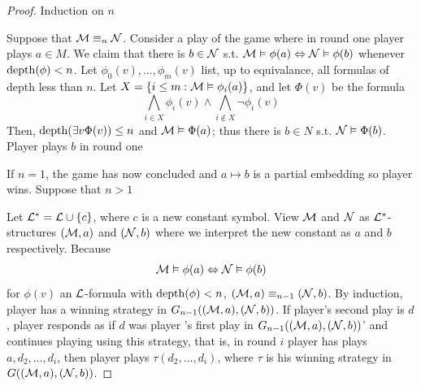 \documentclass[11pt]{article}
\begin{document}
\begin{proof}
Induction on \(n\)

Suppose that \(\mathcal{M}\equiv_n\mathcal{N}\). Consider a play of the game where in
round one player  plays \(a\in M\). We claim that there is
\(b\in\mathcal{N}\) s.t. \(\mathcal{M}\vDash\phi(a)\Leftrightarrow\mathcal{N}\vDash\phi(b)\)
whenever \(\operatorname{depth}(\phi)<n\). Let \(\phi_0(v),\dots,\phi_m(v)\) list, up to
equivalance, all formulas of depth less than \(n\). Let 
\(X=\{i\le m:\mathcal{M}\vDash\phi_i(a)\}\), and let \(\Phi(v)\) be the formula
\begin{equation*}
\displaystyle\bigwedge_{i\in X}\phi_i(v)\wedge\bigwedge_{i\not\in X}
\neg\phi_i(v)
\end{equation*}
Then, \(\operatorname{depth}(\exists v\Phi(v))\le n\) and \(\mathcal{M}\vDash\Phi(a)\); thus
there is \(b\in N\) s.t. \(\mathcal{N}\vDash\Phi(b)\). Player  plays \(b\)
in round one

If \(n=1\), the game has now concluded and \(a\mapsto b\) is a partial
embedding so player  wins. Suppose that \(n>1\)

Let \(\mathcal{L}^*=\mathcal{L}\cup\{c\}\), where \(c\) is a new constant symbol. View
\(\mathcal{M}\) and \(\mathcal{N}\) as \(\mathcal{L}^*\)-structures \((\mathcal{M},a)\) and
\((\mathcal{N},b)\) where we interpret the new constant as \(a\) and \(b\)
respectively. Because 
\begin{equation*}
\mathcal{M}\vDash\phi(a)\Leftrightarrow\mathcal{N}\vDash\phi(b)
\end{equation*}
for \(\phi(v)\) an \(\mathcal{L}\)-formula with \(\operatorname{depth}(\phi)<n\),
\((\mathcal{M},a)\equiv_{n-1}(\mathcal{N},b)\). By induction, player  has a
winning strategy in \(G_{n-1}((\mathcal{M},a),(\mathcal{N},b))\). If player's second
play is \(d\), player  responds as if \(d\) was player 's
first play in \(G_{n-1}((\mathcal{M},a),(\mathcal{N},b))\)' and continues playing using
this strategy, that is, in round \(i\) player  has plays
\(a,d_2,\dots,d_i\), then player  plays \(\tau(d_2,\dots,d_i)\), where 
\(\tau\) is his winning strategy in \(G((\mathcal{M},a),(\mathcal{N},b))\).
\end{proof}
\end{document}
